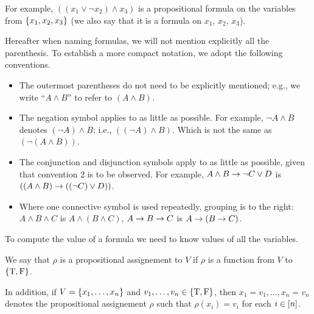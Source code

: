 For example, $((x_1 \lor \lnot x_2) \land x_3)$ is a propositional formula on
the variables from $\set{x_1, x_2, x_3}$ (we also say that it is a formula on
$x_1$, $x_2$, $x_3$).

Hereafter when naming formulas, we will not mention explicitly all the
parenthesis. To establish a more compact notation, we adopt the following
conventions.
\begin{itemize}
  \item The outermost parentheses do not need to be explicitly mentioned; e.g.,
    we write ``$A \land B$'' to refer to $(A \land B)$.
  \item The negation symbol applies to as little as possible.
    For example, $\lnot A \land B$ denotes $(\lnot A) \land B$;
    i.e., $((\lnot A) \land B)$. Which is not the same as
    $(\lnot (A \land B))$.
  \item The conjunction and disjunction symbols apply to as little as possible,
    given that convention 2 is to be observed. For example,
    $A \land B \rightarrow \lnot C \lor D$ is
    $((A \land B) \rightarrow ((\lnot C) \lor D))$.
  \item Where one connective symbol is used repeatedly, grouping is to the
    right: $A \land B \land C$ is $A \land (B \land C)$,
    $A \rightarrow B \rightarrow C$ is $A \rightarrow (B \rightarrow C)$.
\end{itemize}

To compute the value of a formula we need to know values of all the variables.
\begin{definition}
  We say that $\rho$ is a propositional assignement to $V$ if $\rho$
  is a function from $V$ to $\set{\ltrue, \lfalse}$.

  In addition, if $V = \set{x_1, \dots, x_n}$ and
  $v_1, \dots, v_n \in \set{\ltrue, \lfalse}$, then
  $x_1 = v_1, \dots, x_n = v_n$ denotes the propositional assignement
  $\rho$ such that $\rho(x_i) = v_i$ for each $i \in [{n}]$.
\end{definition}

